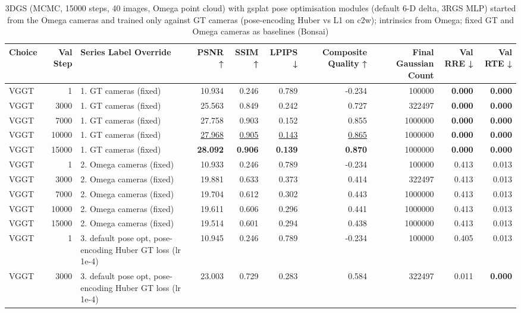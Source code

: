 \begin{table}[H]
\caption{\ifdefined\customcaption \customcaption \else 3DGS (MCMC, 15000 steps, 40 images, Omega point cloud) with gsplat pose optimisation modules (default 6-D delta, 3RGS MLP) started from the Omega cameras and trained only against GT cameras (pose-encoding Huber vs L1 on c2w); intrinsics from Omega; fixed GT and Omega cameras as baselines (Bonsai) \fi}
\label{tab:105_omega_pose_opt_loss_bonsai}
\centering
\tiny
\begin{tabular}{lrlrrrrrrr}
\toprule
Choice & Val Step & Series Label Override & PSNR ↑ & SSIM ↑ & LPIPS ↓ & Composite Quality ↑ & Final Gaussian Count & Val RRE ↓ & Val RTE ↓ \\
\midrule
VGGT & 1 & 1. GT cameras (fixed) & 10.934 & 0.246 & 0.789 & -0.234 & 100000 & \textbf{0.000} & \textbf{0.000} \\
VGGT & 3000 & 1. GT cameras (fixed) & 25.563 & 0.849 & 0.242 & 0.727 & 322497 & \textbf{0.000} & \textbf{0.000} \\
VGGT & 7000 & 1. GT cameras (fixed) & 27.758 & 0.903 & 0.152 & 0.855 & 1000000 & \textbf{0.000} & \textbf{0.000} \\
VGGT & 10000 & 1. GT cameras (fixed) & \underline{27.968} & \underline{0.905} & \underline{0.143} & \underline{0.865} & 1000000 & \textbf{0.000} & \textbf{0.000} \\
VGGT & 15000 & 1. GT cameras (fixed) & \textbf{28.092} & \textbf{0.906} & \textbf{0.139} & \textbf{0.870} & 1000000 & \textbf{0.000} & \textbf{0.000} \\
VGGT & 1 & 2. Omega cameras (fixed) & 10.933 & 0.246 & 0.789 & -0.234 & 100000 & 0.413 & 0.013 \\
VGGT & 3000 & 2. Omega cameras (fixed) & 19.881 & 0.633 & 0.373 & 0.414 & 322497 & 0.413 & 0.013 \\
VGGT & 7000 & 2. Omega cameras (fixed) & 19.704 & 0.612 & 0.302 & 0.443 & 1000000 & 0.413 & 0.013 \\
VGGT & 10000 & 2. Omega cameras (fixed) & 19.611 & 0.606 & 0.296 & 0.441 & 1000000 & 0.413 & 0.013 \\
VGGT & 15000 & 2. Omega cameras (fixed) & 19.514 & 0.601 & 0.294 & 0.438 & 1000000 & 0.413 & 0.013 \\
VGGT & 1 & 3. default pose opt, pose-encoding Huber GT loss (lr 1e-4) & 10.945 & 0.246 & 0.789 & -0.234 & 100000 & 0.405 & 0.013 \\
VGGT & 3000 & 3. default pose opt, pose-encoding Huber GT loss (lr 1e-4) & 23.003 & 0.729 & 0.283 & 0.584 & 322497 & 0.011 & \textbf{0.000} \\

\end{tabular}
\end{table}
